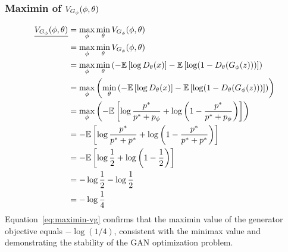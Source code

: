 \subsubsection{Maximin of $V_{G_\phi}(\phi, \theta)$}
\label{sec:maximin-vg}
\begin{align}
	\underline{V_{G_\phi}(\phi, \theta)} & = \max_{\phi} \min_{\theta} V_{G_\phi}(\phi, \theta) \nonumber                                                                                                          \\
	                & = \max_{\phi}\min_{\theta} V_{G_\phi}(\phi, \theta) \nonumber                                                                                                           \\
	                & = \max_{\phi}\min_{\theta} \left( -\mathbb{E}\left[\log{D_\theta(x)}\right] - \mathbb{E}\left[\log(1 - D_\theta(G_\phi(z)))\right] \right) \nonumber               \\
	                & = \max_{\phi}\left(\min_{\theta} \left( -\mathbb{E}\left[\log{D_\theta(x)}\right] - \mathbb{E}\left[\log(1 - D_\theta(G_\phi(z)))\right] \right) \right) \nonumber \\
	                & = \max_{\phi}\left( -\mathbb{E}\left[\log\frac{p^*}{p^* + p_{\phi}} + \log\left(1 - \frac{p^*}{p^* + p_{\phi}}\right) \right] \right) \nonumber              \\
	                & = -\mathbb{E}\left[\log\frac{p^*}{p^* + p^*} + \log\left(1 - \frac{p^*}{p^* + p^*}\right) \right] \nonumber                                        \\
	                & = - \mathbb{E}\left[\log\frac{1}{2} + \log{\left(1 - \frac{1}{2}\right)}\right] \nonumber                                                          \\
	                & = - \log\frac{1}{2} - \log\frac{1}{2} \nonumber                                                                                                    \\
	                & = - \log\frac{1}{4} \label{eq:maximin-vg}
\end{align}
Equation~\ref{eq:maximin-vg} confirms that the maximin value of the generator
objective equals $-\log(1/4)$, consistent with the minimax value and
demonstrating the stability of the GAN optimization problem.
